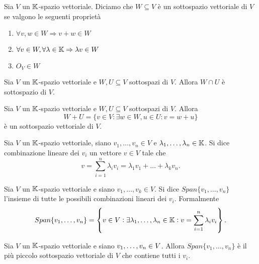 \begin{definition}
	Sia $ V $ un $ \mathbb{K} $-spazio vettoriale. Diciamo che $ W \subseteq V $ è un sottospazio vettoriale di $ V $ se valgono le seguenti proprietà
	\begin{enumerate}[label=(\roman*)]
		\item $ \forall v, w \in W \Rightarrow v + w \in W $
		\item $ \forall v \in W, \forall \lambda \in \mathbb{K} \Rightarrow \lambda v \in W $
		\item $ O_V \in W $
	\end{enumerate}
\end{definition}

\begin{thm}
	Sia $ V $ un $ \mathbb{K} $-spazio vettoriale e $ W, U \subseteq V $ sottospazi di $ V $. Allora $ W \cap U $ è sottospazio di $ V $. 
\end{thm}

\begin{thm}
	Sia $ V $ un $ \mathbb{K} $-spazio vettoriale e $ W, U \subseteq V $ sottospazi di $ V $. Allora \[W + U = \{v \in V : \exists w \in W, u \in U : v = w + u\}\] è un sottospazio vettoriale di $ V $. 
\end{thm}

\begin{definition}
	Sia $ V $ un $ \mathbb{K} $-spazio vettoriale, siano $ v_1, \ldots , v_n \in V $ e $ \lambda_1, \ldots , \lambda_n \in \mathbb{K} $. Si dice combinazione lineare dei $ v_i $ un vettore $ v \in V $ tale che \[v = \sum_{i = 1}^{n} \lambda_i v_i = \lambda_1 v_1 + \ldots + \lambda_k v_n.\]
\end{definition}

\begin{definition}[Span]
	Sia $ V $ un $ \mathbb{K} $-spazio vettoriale e siano $ v_1, \ldots, v_k \in V $. Si dice $ Span{\{v_1, \ldots , v_n\}} $ l'insieme di tutte le possibili combinazioni lineari dei $ v_i $. Formalmente
	\[Span{\{v_1, \ldots , v_n\}} = \left\{ v \in V: \exists \lambda_1, \ldots , \lambda_n \in \mathbb{K}: v = \sum_{i=1}^{n} \lambda_i v_i \right\}.\]
\end{definition}

\begin{thm}
	Sia $ V $ un $ \mathbb{K} $-spazio vettoriale e siano $ v_1, \ldots , v_n \in \nolinebreak V $. Allora $ Span\{v_1, \ldots , v_n\} $ è il più piccolo sottospazio vettoriale di $ V $ che contiene tutti i $ v_i $.
\end{thm}

